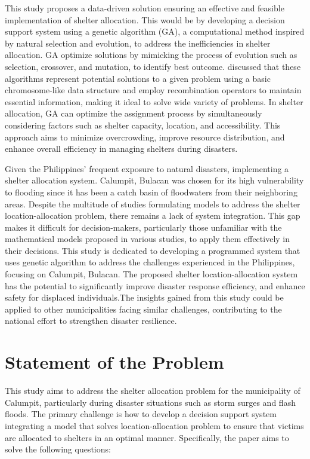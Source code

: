 	This study proposes a data-driven solution ensuring an effective and feasible implementation of shelter allocation. This would be by developing a decision support system using a genetic algorithm (GA), a computational method inspired by natural selection and evolution, to address the inefficiencies in shelter allocation. GA optimize solutions by mimicking the process of evolution such as selection, crossover, and mutation, to identify best outcome. \textcite{Mathew2012} discussed that these algorithms represent potential solutions to a given problem using a basic chromosome-like data structure and employ recombination operators to maintain essential information, making it ideal to solve wide variety of problems. In shelter allocation, GA can optimize the assignment process by simultaneously considering factors such as shelter capacity, location, and accessibility. This approach aims to minimize overcrowding, improve resource distribution, and enhance overall efficiency in managing shelters during disasters.
		
	Given the Philippines' frequent exposure to natural disasters, implementing a shelter allocation system. Calumpit, Bulacan was chosen for its high vulnerability to flooding since it has been a catch basin of floodwaters from their neighboring areas. Despite the multitude of studies formulating models to address the shelter location-allocation problem, there remains a lack of system integration. This gap makes it difficult for decision-makers, particularly those unfamiliar with the mathematical models proposed in various studies, to apply them effectively in their decisions. This study is dedicated to developing a programmed system that uses genetic algorithm to address the challenges experienced in the Philippines, focusing on Calumpit, Bulacan. The proposed shelter location-allocation system has the potential to significantly improve disaster response efficiency, and enhance safety for displaced individuals.The insights gained from this study could be applied to other municipalities facing similar challenges, contributing to the national effort to strengthen disaster resilience. 

\section{Statement of the Problem}
	This study aims to address the shelter allocation problem for the municipality of Calumpit, particularly during disaster situations such as storm surges and flash floods. The primary challenge is how to develop a decision support system integrating a model that solves location-allocation problem to ensure that victims are allocated to shelters in an optimal manner. Specifically, the paper aims to solve the following questions:
	
